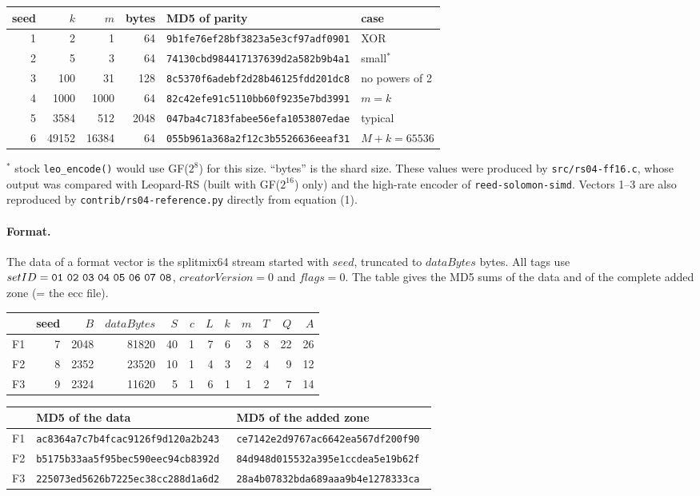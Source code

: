 \medskip
{\footnotesize
\begin{tabular}{|r|r|r|r|l|l|}
\hline
seed & $k$ & $m$ & bytes & MD5 of parity & case \\
\hline
1 & 2 & 1 & 64 & {\tt 9b1fe76ef28bf3823a5e3cf97adf0901} & XOR \\
2 & 5 & 3 & 64 & {\tt 74130cbd984417137639d2a582b9b4a1} & small$^*$ \\
3 & 100 & 31 & 128 & {\tt 8c5370f6adebf2d28b46125fdd201dc8} & no powers of 2 \\
4 & 1000 & 1000 & 64 & {\tt 82c42efe91c5110bb60f9235e7bd3991} & $m = k$ \\
5 & 3584 & 512 & 2048 & {\tt 047ba4c7183fabee56efa1053807edae} & typical \\
6 & 49152 & 16384 & 64 & {\tt 055b961a368a2f12c3b5526636eeaf31} & $M + k = 65536$ \\
\hline
\end{tabular}
}
\medskip

$^*$ stock {\tt leo\_encode()} would use GF($2^8$) for this size.
``bytes'' is the shard size. These values were produced by {\tt src/rs04-ff16.c}, whose output was
compared with Leopard-RS (built with GF($2^{16}$) only) and the high-rate
encoder of {\tt reed-solomon-simd}. Vectors 1--3 are also reproduced by
{\tt contrib/rs04-reference.py} directly from equation (1).

\paragraph{Format.} The data of a format vector is the splitmix64 stream
started with $seed$, truncated to $dataBytes$ bytes. All tags use
$setID = {\tt 01\ 02\ 03\ 04\ 05\ 06\ 07\ 08}$, $creatorVersion = 0$ and
$flags = 0$. The table gives the MD5 sums of the data and of the complete
added zone (= the ecc file).

\medskip
{\footnotesize
\begin{tabular}{|l|r|r|r|r|r|r|r|r|r|r|r|}
\hline
 & seed & $B$ & $dataBytes$ & $S$ & $c$ & $L$ & $k$ & $m$ & $T$ & $Q$ & $A$ \\
\hline
F1 & 7 & 2048 & 81820 & 40 & 1 & 7 & 6 & 3 & 8 & 22 & 26 \\
F2 & 8 & 2352 & 23520 & 10 & 1 & 4 & 3 & 2 & 4 & 9 & 12 \\
F3 & 9 & 2324 & 11620 & 5 & 1 & 6 & 1 & 1 & 2 & 7 & 14 \\
\hline
\end{tabular}

\medskip
\begin{tabular}{|l|l|l|}
\hline
 & MD5 of the data & MD5 of the added zone \\
\hline
F1 & \tt ac8364a7c7b4fcac9126f9d120a2b243 & \tt ce7142e2d9767ac6642ea567df200f90 \\
F2 & \tt b5175b33aa5f95bec590eec94cb8392d & \tt 84d948d015532a395e1ccdea5e19b62f \\
F3 & \tt 225073ed5626b7225ec38cc288d1a6d2 & \tt 28a4b07832bda689aaa9b4e1278333ca \\
\hline
\end{tabular}
}
\medskip

